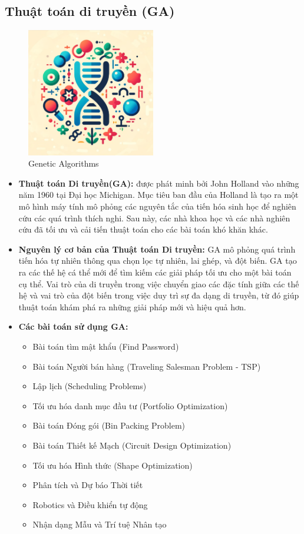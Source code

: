 \documentclass[14pt]{article}
\begin{document}
	\subsection{Thuật toán di truyền (GA)}
	\begin{figure}[h]
		\centering
		\includegraphics[width=0.5\textwidth]{./Image/IconGA.png}
		\caption{Genetic Algorithms}
		\label{fig:mylabel}
	\end{figure}
	\begin{itemize}
		\item \textbf{Thuật toán Di truyền(GA):} được phát minh bởi John Holland vào những năm 1960 tại Đại học Michigan. Mục tiêu ban đầu của Holland là tạo ra một mô hình máy tính mô phỏng các nguyên tắc của tiến hóa sinh học để nghiên cứu các quá trình thích nghi. Sau này, các nhà khoa học và các nhà nghiên cứu đã tối ưu và cải tiến thuật toán cho các bài toán khó khăn khác.
		\item \textbf{Nguyên lý cơ bản của Thuật toán Di truyền:} GA mô phỏng quá trình tiến hóa tự nhiên thông qua chọn lọc tự nhiên, lai ghép, và đột biến. GA tạo ra các thế hệ cá thể mới để tìm kiếm các giải pháp tối ưu cho một bài toán cụ thể. Vai trò của di truyền trong việc chuyển giao các đặc tính giữa các thế hệ và vai trò của đột biến trong việc duy trì sự đa dạng di truyền, từ đó giúp thuật toán khám phá ra những giải pháp mới và hiệu quả hơn.
		\item \textbf{Các bài toán sử dụng GA:} 
		\begin{itemize}
			\item Bài toán tìm mật khẩu (Find Password)
			\item Bài toán Người bán hàng (Traveling Salesman Problem - TSP)
			\item Lập lịch (Scheduling Problems)
			\item Tối ưu hóa danh mục đầu tư (Portfolio Optimization)
			\item Bài toán Đóng gói (Bin Packing Problem)
			\item Bài toán Thiết kế Mạch (Circuit Design Optimization)
			\item Tối ưu hóa Hình thức (Shape Optimization)
			\item Phân tích và Dự báo Thời tiết
			\item Robotics và Điều khiển tự động
			\item Nhận dạng Mẫu và Trí tuệ Nhân tạo
		\end{itemize}
	\end{itemize}
\end{document}
